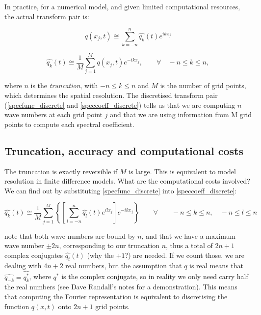 In practice, for a numerical model, and given limited computational resources, the actual transform pair is:

\begin{equation}
	q(x_j,t) \cong \sum_{k=-n}^{n} \widehat{q_k}(t)e^{ikx_j}
	\label{specfunc_discrete}
\end{equation}

\begin{equation}
	\widehat{q_k}(t) \cong  \frac{1}{M}  \sum_{j=1}^{M} q(x_j,t) e^{-ikx_j}, \qquad  \forall \quad -n \le k \le n,
		\label{speccoeff_discrete}
\end{equation}

 where $n$ is the \emph{truncation}, with $-n \le k \le n$  and $M$ is the number of grid points, which determines the spatial resolution. The discretised transform pair (\ref{specfunc_discrete} and \ref{speccoeff_discrete}) tells us that we are computing $n$ wave numbers at each grid point $j$ and that we are using information from M grid points to compute each spectral coefficient. 
 
 \subsection{Truncation, accuracy and computational costs}
 The truncation is exactly reversible if $M$ is large. This is equivalent to model resolution in finite difference models. What are the computational costs involved? We can find out by substituting \ref{specfunc_discrete} into \ref{speccoeff_discrete}:
 
 \begin{equation}
 	\widehat{q_k}(t) \cong  \frac{1}{M} \sum_{j=1}^{M}  \left\{  \left[   \sum_{l=-n}^{n} \widehat{q_l}(t) e^{ilx_j}  \right]  e^{-ikx_j}  \right\}  \qquad  \forall \qquad -n \le k \le n,  \quad -n \le l \le n
 	\label{spectral_costs}
 \end{equation}

note that both wave numbers are bound by $n$, and that we have a maximum wave number $\pm 2n$, corresponding to our truncation $n$, thus a total of $2n+1$ complex conjugates $\widehat{q_t}(t)$ (why the $+1$?) are needed. If we count those, we are dealing with $4n+2$ real numbers, but the assumption that $q$ is real means that $\widehat{q_{-k}}=\widehat{q_k^*}$, where $q^*$ is the complex conjugate, so in reality we only need carry half the real numbers (see Dave Randall's notes for a demonstration). This means that computing the Fourier representation is equivalent to discretising the function $q(x,t)$ onto $2n+1$ grid points.

